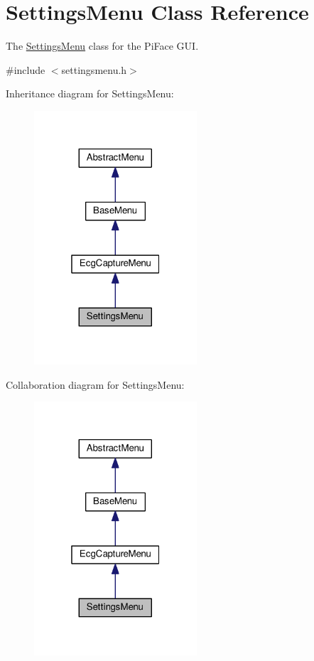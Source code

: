 \hypertarget{classSettingsMenu}{}\section{Settings\+Menu Class Reference}
\label{classSettingsMenu}


The \hyperlink{classSettingsMenu}{Settings\+Menu} class for the Pi\+Face G\+UI.  




{\ttfamily \#include $<$settingsmenu.\+h$>$}



Inheritance diagram for Settings\+Menu\+:
\nopagebreak
\begin{figure}[H]
\begin{center}
\leavevmode
\includegraphics[width=172pt]{classSettingsMenu__inherit__graph}
\end{center}
\end{figure}


Collaboration diagram for Settings\+Menu\+:
\nopagebreak
\begin{figure}[H]
\begin{center}
\leavevmode
\includegraphics[width=172pt]{classSettingsMenu__coll__graph}
\end{center}
\end{figure}
